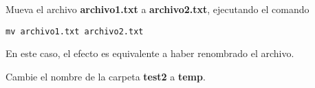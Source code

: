 \documentclass[11pt]{exam}
\begin{document}
\begin{questions}
\begin{parts}
\item Mueva el archivo \textbf{archivo1.txt} a \textbf{archivo2.txt}, ejecutando el comando

\begin{verbatim}
mv archivo1.txt archivo2.txt
\end{verbatim}

En este caso, el efecto es equivalente a haber renombrado el archivo.

\item Cambie el nombre de la carpeta \textbf{test2} a \textbf{temp}.

\end{parts}

%
%
%
%
%
%
%
%
%
%
%

\end{questions}
\end{document}
